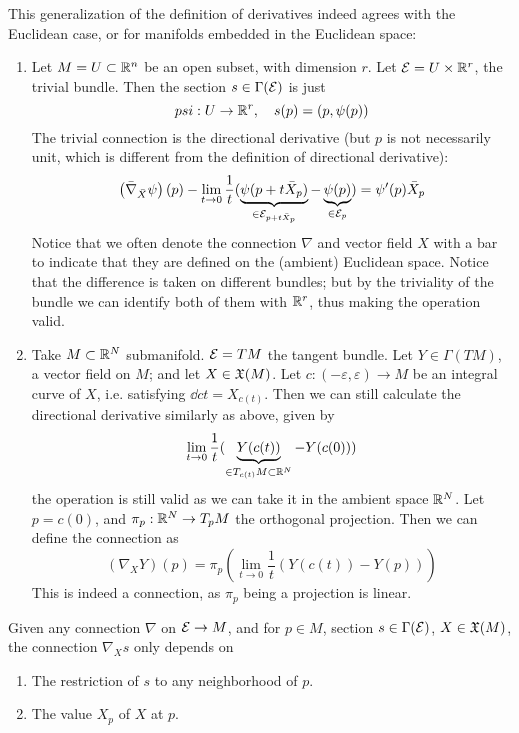 \documentclass{article}
\begin{document}
\begin{example}
    This generalization of the definition of derivatives indeed agrees with the Euclidean case, or for manifolds embedded in the Euclidean space:
    \begin{enumerate}
        \item Let $M = U \subset \mathbb{R}^n$ be an open subset, with dimension $r$. Let $\mathcal{E} = U \times \mathbb{R}^r$, the trivial bundle. Then the section $s \in \Gamma(\mathcal{E})$ is just 
        \[
            psi: U \to \mathbb{R}^r, \quad s(p) = (p, \psi(p))
        \]
        The trivial connection is the directional derivative (but $p$ is not necessarily unit, which is different from the definition of directional derivative):
        \[
            \left( \bar{\nabla}_{\bar{X}} \psi \right) (p) - \lim_{t \to 0} \frac{1}{t} ( \underbrace{\psi(p + t \bar{X}_p)}_{\in \mathcal{E}_{p + t \bar{X}_p}} - \underbrace{\psi(p)}_{\in \mathcal{E}_p} ) = \psi'(p) \bar{X}_p
        \]
        Notice that we often denote the connection $\nabla$ and vector field $X$ with a bar to indicate that they are defined on the (ambient) Euclidean space. Notice that the difference is taken on different bundles; but by the triviality of the bundle we can identify both of them with $\mathbb{R}^r$, thus making the operation valid.
        \item Take $M \subset \mathbb{R}^N$ submanifold. $\mathcal{E} = TM$ the tangent bundle. Let $Y \in \Gamma(TM)$, a vector field on $M$; and let $X \in \mathfrak{X}(M)$. Let $c: (-\varepsilon, \varepsilon) \to M$ be an integral curve of $X$, i.e. satisfying $\dd{c}{t} = X_{c(t)}$. Then we can still calculate the directional derivative similarly as above, given by
        \[
            \lim_{t \to 0} \frac{1}{t} ( \underbrace{Y(c(t))}_{\in T_{c(t)} M \subset \mathbb{R}^N} - Y(c(0)) )
        \]
        the operation is still valid as we can take it in the ambient space $\mathbb{R}^N$. Let $p = c(0)$, and $\pi_p: \mathbb{R}^N \to T_p M$ the orthogonal projection. Then we can define the connection as
        \[
            \left( \nabla_X Y \right) (p) = \pi_p \left(\lim_{t \to 0} \frac{1}{t} (Y(c(t)) - Y(p))\right)
        \]
        This is indeed a connection, as $\pi_p$ being a projection is linear.
    \end{enumerate}
\end{example}

\begin{lemma}
    Given any connection $\nabla$ on $\mathcal{E} \to M$, and for $p \in M$, section $s \in \Gamma(\mathcal{E})$, $X \in \mathfrak{X}(M)$, the connection $\nabla_X s$ only depends on
    \begin{enumerate}
        \item The restriction of $s$ to any neighborhood of $p$.
        \item The value $X_p$ of $X$ at $p$.
    \end{enumerate}
\end{lemma}
\end{document}
